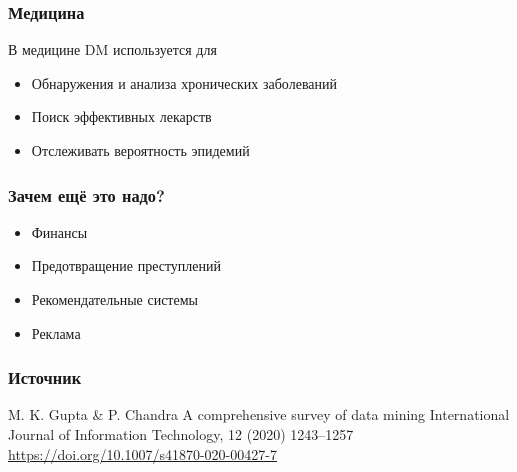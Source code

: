 \begin{frame}
    \frametitle{Медицина}

    В медицине DM используется для
    \begin{itemize}
        \item Обнаружения и анализа хронических заболеваний
        \item Поиск эффективных лекарств
        \item Отслеживать вероятность эпидемий
    \end{itemize}

\end{frame}

\begin{frame}
    \frametitle{Зачем ещё это надо?}

    \begin{itemize}
        \item Финансы
        \item Предотвращение преступлений
        \item Рекомендательные системы
        \item Реклама
    \end{itemize}

\end{frame}

\appendix
\begin{frame}
    \frametitle{Источник}
    \begin{thebibliography}{}
        M. K. Gupta \& P. Chandra \newblock
        A comprehensive survey of data mining \newblock
        International Journal of Information Technology, 12 (2020) 1243–1257 \newblock
        \url{https://doi.org/10.1007/s41870-020-00427-7}
    \end{thebibliography}
\end{frame}


